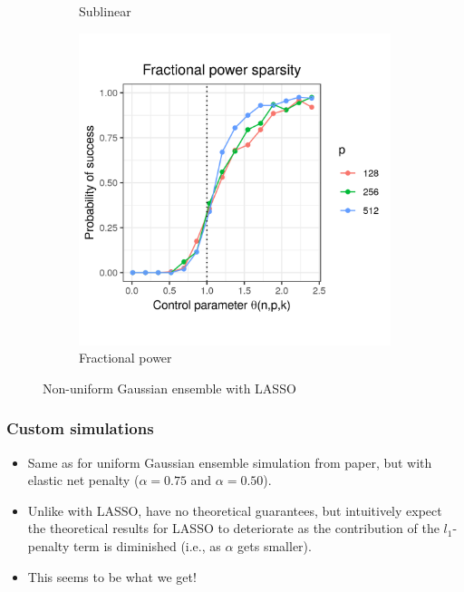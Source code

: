 \documentclass{beamer}
\begin{document}
\begin{frame}
\begin{figure}[h]
\begin{subfigure}{0.32\textwidth}
    \caption{Sublinear}
  \end{subfigure}
  \begin{subfigure}{0.32\textwidth}
    \includegraphics[width=0.9\linewidth]{nonuniform_fractional_power_sparsity_alpha_1}
    \caption{Fractional power}
  \end{subfigure}
  \caption{Non-uniform Gaussian ensemble with LASSO}
\end{figure}

\end{frame}

\begin{frame}
\frametitle{Custom simulations}

\begin{itemize}
\item Same as for uniform Gaussian ensemble simulation from paper, but
  with elastic net penalty ($\alpha = 0.75$ and $\alpha = 0.50$).
\item Unlike with LASSO, have no theoretical guarantees, but
  intuitively expect the theoretical results for LASSO to deteriorate
  as the contribution of the $l_1$-penalty term is diminished (i.e.,
  as $\alpha$ gets smaller).
\item This seems to be what we get!
\end{itemize}

\end{frame}
\end{document}
